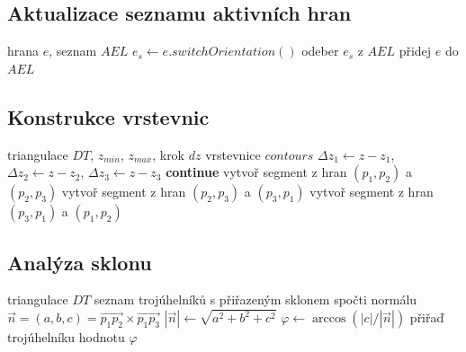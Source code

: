 \documentclass[11pt, a4paper]{article}
\begin{document}
\subsection{Aktualizace seznamu aktivních hran}
\begin{algorithm}[H] \caption{Update AEL}
\begin{algorithmic}[1]
\Require hrana $e$, seznam $AEL$
\State $e_s \gets e.switchOrientation()$
    \State odeber $e_s$ z $AEL$
\Else
    \State přidej $e$ do $AEL$
\EndIf
\end{algorithmic}
\end{algorithm}

\subsection{Konstrukce vrstevnic}
\begin{algorithm}[H] \caption{Create Contour Lines}
\begin{algorithmic}[1]
\Require triangulace $DT$, $z_{min}$, $z_{max}$, krok $dz$
\Ensure vrstevnice $contours$
        \State $\Delta z_1 \gets z - z_1$, $\Delta z_2 \gets z - z_2$, $\Delta z_3 \gets z - z_3$
         \textbf{continue}
            \State vytvoř segment z hran $(p_1, p_2)$ a $(p_2, p_3)$
            \State vytvoř segment z hran $(p_2, p_3)$ a $(p_3, p_1)$
            \State vytvoř segment z hran $(p_3, p_1)$ a $(p_1, p_2)$
        \EndIf
    \EndFor
\EndFor
\end{algorithmic}
\end{algorithm}

\subsection{Analýza sklonu}
\begin{algorithm}[H] \caption{Analyze Slope}
\begin{algorithmic}[1]
\Require triangulace $DT$
\Ensure seznam trojúhelníků s přiřazeným sklonem
    \State spočti normálu $\vec{n} = (a, b, c) = \vec{p_1 p_2} \times \vec{p_1 p_3}$
    \State $|\vec{n}| \gets \sqrt{a^2 + b^2 + c^2}$
    \State $\varphi \gets \arccos(|c| / |\vec{n}|)$
    \State přiřaď trojúhelníku hodnotu $\varphi$
\EndFor
\end{algorithmic}
\end{algorithm}
\end{document}
